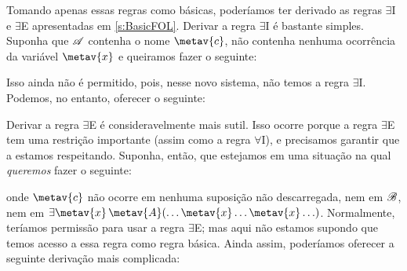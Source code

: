 Tomando apenas essas regras como básicas, poderíamos ter derivado as regras $\exists$I e $\exists$E apresentadas em \cref{s:BasicFOL}. Derivar a regra $\exists$I é bastante simples. Suponha que $\mathscr{A}$ contenha o nome $\metav{c}$, não contenha nenhuma ocorrência da variável $\metav{x}$ e queiramos fazer o seguinte:
\begin{fitchproof}
\end{fitchproof}
Isso ainda não é permitido, pois, nesse novo sistema, não temos a regra $\exists$I. Podemos, no entanto, oferecer o seguinte:
\begin{fitchproof}
	\open
		\AS
	\close
\end{fitchproof}\noindent
Derivar a regra $\exists$E é consideravelmente mais sutil. Isso ocorre porque a regra $\exists$E tem uma restrição importante (assim como a regra $\forall$I), e precisamos garantir que a estamos respeitando. Suponha, então, que estejamos em uma situação na qual \emph{queremos} fazer o seguinte:
\begin{fitchproof}
	\open
		\AS
	\close
\end{fitchproof}\noindent
onde $\metav{c}$ não ocorre em nenhuma suposição não descarregada, nem em $\mathscr{B}$, nem em $\exists \metav{x}\, \metav{A}(\ldots \metav{x} \ldots \metav{x}\ldots)$. Normalmente, teríamos permissão para usar a regra $\exists$E; mas aqui não estamos supondo que temos acesso a essa regra como regra básica. Ainda assim, poderíamos oferecer a seguinte derivação mais complicada:

